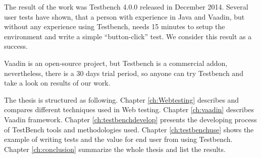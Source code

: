 	  The result of the work was Testbench 4.0.0 released in December 2014.
	  Several user tests have shown, that a person with experience in Java and
	  Vaadin, but without any experience using Testbench, needs 15 minutes to setup
	  the environment and write a simple ``button-click'' test. We consider this
	  result as a success.
	  
	  Vaadin is an open-source project, but Testbench is a commercial
	  addon, nevertheless, there is a 30 days trial period, so anyone
	  can try Testbench and take a look on results of our work.
	  
	  The thesis is structured as following. Chapter \ref{ch:Webtesting}
	  describes and compares different techniques used in Web testing.
	  Chapter \ref{ch:vaadin} describes Vaadin framework.
	  Chapter \ref{ch:testbenchdevelop} presents the developing process of
	  TestBench tools and methodologies used. Chapter \ref{ch:testbenchuse} shows the example of writing tests and the value for
	  end user from using Testbench. Chapter \ref{ch:conclusion} summarize the whole
	  thesis and list the results.